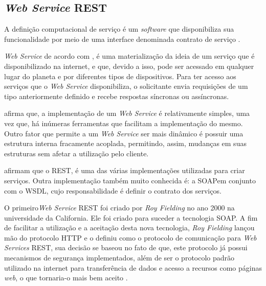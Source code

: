 \subsection{\textit{Web Service} REST}

A definição computacional de serviço é um \textit{software} que disponibiliza sua funcionalidade por meio de uma interface denominada contrato de serviço \cite{erl_soa_with_rest}.

\textit{Web Service} de acordo com , é uma materialização da ideia de um serviço que é disponibilizado na internet, e que, devido a isso, pode ser acessado em qualquer lugar do planeta e por diferentes tipos de dispositivos. Para ter acesso aos serviços que o \textit{Web Service} disponibiliza, o solicitante envia requisições de um tipo anteriormente definido e recebe respostas síncronas ou assíncronas.

 afirma que, a implementação de um \textit{Web Service} é relativamente simples, uma vez que, há inúmeras ferramentas que facilitam a implementação do mesmo. Outro fator que permite a um \textit{Web Service} ser mais dinâmico é possuir uma estrutura interna fracamente acoplada, permitindo, assim, mudanças em suas estruturas sem afetar a utilização pelo cliente.

 afirmam que o REST\footnotemark[20], é uma das várias implementações utilizadas para criar serviços. Outra implementação também muito conhecida é: a SOAP\footnotemark[21] em conjunto com o WSDL\footnotemark[22], cujo responsabilidade é definir o contrato dos serviços.




O primeiro\textit{Web Service} REST foi criado por \textit{Roy Fielding} no ano 2000 na universidade da California. Ele foi criado para suceder a tecnologia SOAP. A fim de facilitar a utilização e a aceitação desta nova tecnologia, \textit{Roy Fielding} lançou mão do protocolo HTTP e o definiu como o protocolo de comunicação para \textit{Web Services} REST, sua decisão se baseou no fato de que, este protocolo já possui mecanismos de segurança implementados, além de ser o protocolo padrão utilizado na internet para transferência de dados e acesso a recursos como páginas \textit{web}, o que tornaria-o mais bem aceito \cite{ibm_web_service}.

